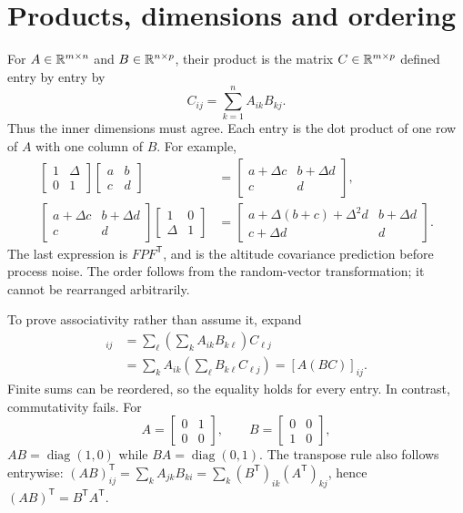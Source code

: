 \section{Products, dimensions and ordering}
For $A\in\mathbb{R}^{m\times n}$ and $B\in\mathbb{R}^{n\times p}$, their product is the
matrix $C\in\mathbb{R}^{m\times p}$ defined entry by entry by
\begin{equation}C_{ij}=\sum_{k=1}^n A_{ik}B_{kj}.\end{equation}
Thus the inner dimensions must agree. Each entry is the dot product of one
row of $A$ with one column of $B$. For example,
\begin{align}
\begin{bmatrix}1&\Delta\\0&1\end{bmatrix}
\begin{bmatrix}a&b\\c&d\end{bmatrix}
&=\begin{bmatrix}a+\Delta c&b+\Delta d\\c&d\end{bmatrix},\\
\begin{bmatrix}a+\Delta c&b+\Delta d\\c&d\end{bmatrix}
\begin{bmatrix}1&0\\\Delta&1\end{bmatrix}
&=\begin{bmatrix}a+\Delta(b+c)+\Delta^2d&b+\Delta d\\c+\Delta d&d\end{bmatrix}.
\end{align}
The last expression is $FPF^{\mathsf T}$, and is the altitude covariance
prediction before process noise. The order follows from the random-vector
transformation; it cannot be rearranged arbitrarily.

To prove associativity rather than assume it, expand
\begin{align}
[(AB)C]_{ij}
 &=\sum_\ell\left(\sum_k A_{ik}B_{k\ell}\right)C_{\ell j}\\
 &=\sum_k A_{ik}\left(\sum_\ell B_{k\ell}C_{\ell j}\right)
 =[A(BC)]_{ij}.
\end{align}
Finite sums can be reordered, so the equality holds for every entry. In
contrast, commutativity fails. For
\begin{equation}
A=\begin{bmatrix}0&1\\0&0\end{bmatrix},\qquad
B=\begin{bmatrix}0&0\\1&0\end{bmatrix},
\end{equation}
$AB=\operatorname{diag}(1,0)$ while $BA=\operatorname{diag}(0,1)$.
The transpose rule also follows entrywise:
$(AB)^{\mathsf T}_{ij}=\sum_k A_{jk}B_{ki}
=\sum_k(B^{\mathsf T})_{ik}(A^{\mathsf T})_{kj}$, hence
$(AB)^{\mathsf T}=B^{\mathsf T}A^{\mathsf T}$.

